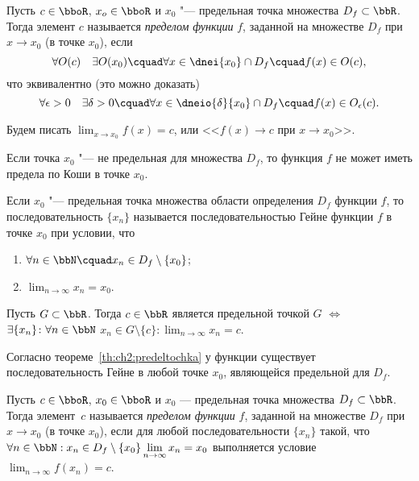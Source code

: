 \begin{defn}\label{df:ch2:predelCaushi}
Пусть $c\in\bboR$, $x_o \in \bboR$ и $x_0$ "--- предельная точка множества $D_f \subset \bbR$. Тогда элемент $c$ называется \textit{пределом функции} $f$, заданной на множестве $D_f$ при $x \to x_0$ (в точке $x_0$), если
$$
\forall O(c)\quad \exists O(x_0)\cquad \forall x \in \dnei{x_0}\cap D_f\cquad f(x) \in O(c),
$$  
что эквивалентно (это можно доказать)
$$
\forall \epsilon > 0\quad \exists \delta >0\cquad \forall x \in \dneio{\delta}{x_0} \cap D_f\cquad f(x) \in O_\epsilon (c). 
$$

Будем писать $\lim_{x \to x_0}\limits f(x) = c$, или <<$f(x)\to c$ при $x \to x_0$>>.
\end{defn}
Если точка $x_0$ "--- не предельная для множества $D_f$, то функция $f$ не может иметь предела по Коши в точке $x_0$. %

\begin{defn}
Если $x_0$ "--- предельная точка множества области определения $D_f$ функции $f$, то последовательность $\{x_n\}$ называется последовательностью Гейне функции $f$ в точке $x_0$ при условии, что
\begin{enumerate}
\item $\forall n \in \bbN\cquad x_n\in D_f\setminus \{x_0\}$;
\item $\lim_{n \to \infty}\limits x_n = x_0$.
\end{enumerate}
\end{defn}

\begin{thm}
\label{th:ch2:predeltochka}
Пусть $G \subset \bbR$. Тогда $c \in \bbR$ является предельной точкой $G$ $\Longleftrightarrow$ $ \exists \{x_n\}\colon \forall n \in \bbN$ $x_n \in G\setminus\{c\}\colon \lim_{n \to \infty}\limits x_n = c$. 
\end{thm}

Согласно теореме~\ref{th:ch2:predeltochka} у функции существует последовательность Гейне в любой точке $x_0$, являющейся предельной для $D_f$.

\begin{defn}\label{df:ch2:predelGeine}
Пусть $c\in\bboR$, $x_0 \in \bboR$ и $x_0$ --- предельная точка множества $D_f \subset \bbR$. Тогда элемент~$c$ называется \textit{пределом функции} $f$, заданной на множестве $D_f$ при $x \to x_0$ (в точке $x_0$), если для любой последовательности $\{x_n\}$ такой, что $\forall n \in \bbN: x_n\in D_f\setminus \{x_0\} \lim_{n \to \infty}\limits x_n = x_0$ выполняется условие $\lim_{n \to \infty}\limits f(x_n) = c$. 
\end{defn}

